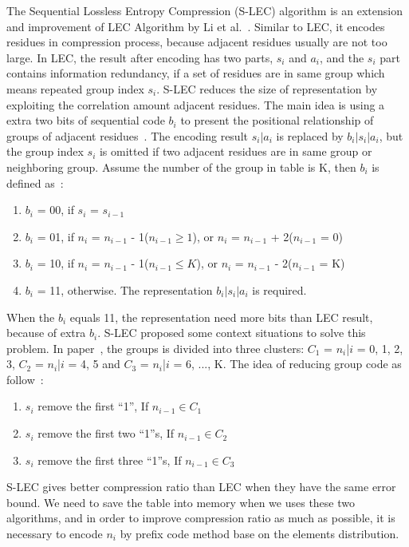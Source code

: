 The Sequential Lossless Entropy Compression (S-LEC) algorithm is an extension
and improvement of LEC Algorithm by Li et al.~\cite{li2016temporal}. Similar to
LEC, it encodes residues in compression process, because adjacent residues
usually are not too large. In LEC, the result after encoding has two parts,
$s_i$ and $ a_i$, and the $s_i$ part contains information redundancy, if a set
of residues are in same group which means repeated group index $s_i$. S-LEC
reduces the size of representation by exploiting the correlation amount adjacent
residues. The main idea is using a extra two bits of sequential code $b_i$ to
present the positional relationship of groups of adjacent
residues~\cite{li2016temporal}. The encoding result $s_i|a_i$ is replaced by
$b_i|s_i|a_i$, but the group index $s_i$ is omitted if two adjacent residues are
in same group or neighboring group. Assume the number of the group in table is
K, then $b_i$ is defined as~\cite{li2016temporal}: 

\begin{enumerate}
    \item $b_i$ = 00, if $s_i$ = $s_{i-1}$
    \item $b_i$ = 01, if $n_i$ = $n_{i-1}$ - 1($n_{i-1} \geqslant 1$), or $n_i$
    = $n_{i-1}$ + 2($n_{i-1}$ = 0)
    \item $b_i$ = 10, if $n_i$ = $n_{i-1}$ - 1($n_{i-1} \leqslant K$), or $n_i$
    = $n_{i-1}$ - 2($n_{i-1}$ = K)
    \item $b_i$ = 11, otherwise. The representation $b_i|s_i|a_i$ is required. 
  \end{enumerate}

When the $b_i$ equals 11, the representation need more bits than LEC result,
because of extra $b_i$. S-LEC proposed some context situations to solve this
problem. In paper~\cite{li2016temporal}, the groups is divided into three
clusters: $C_1$ = {$n_i$|$i$ = 0, 1, 2, 3}, $C_2$ = {$n_i$|$i$ = 4, 5} and 
$C_3$ = {$n_i$|$i$ = 6, ..., K}. The idea of reducing group code as
follow~\cite{li2016temporal}:

\begin{enumerate}
    \item $s_i$ remove the first ``1'', If $n_{i-1} \in C_1$
    \item $s_i$ remove the first two ``1''s, If $n_{i-1} \in C_2$
    \item $s_i$ remove the first three ``1''s, If $n_{i-1} \in C_3$
\end{enumerate}
S-LEC gives better compression ratio than LEC when they have the same error
bound. We need to save the table into memory when we uses these two algorithms,
and in order to improve compression ratio as much as possible, it is necessary
to encode $n_i$ by prefix code method base on the elements distribution.

